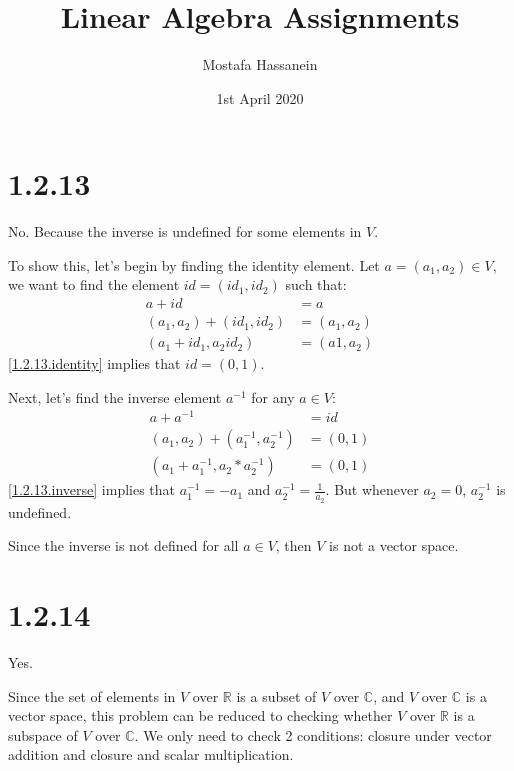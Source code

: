 \documentclass{article}
\author{Mostafa Hassanein}
\title{Linear Algebra Assignments}
\date{1st April 2020}
\begin{document}
\maketitle

\newpage

\section*{1.2.13}

No. Because the inverse is undefined for some elements in $V$.
\newline

\noindent 
To show this, let's begin by finding the identity element. Let $a=(a_1,a_2) \in V$, we want to find the element $id=(id_1, id_2)$ such that:
\begin{align}
  a+id&=a \nonumber \\
  (a_1, a_2) + (id_1, id_2) &= (a_1, a_2) \nonumber \\
  (a_1 + id_1, a_2id_2) &= (a1, a_2) \label{1.2.13.identity}
\end{align}
\eqref{1.2.13.identity} implies that $id=(0,1)$.
\newline

\noindent
Next, let's find the inverse element $a^{-1}$ for any $a \in V$:
\begin{align}
  a + a^{-1} &= id \nonumber \\
  (a_1, a_2) + (a^{-1}_1, a^{-1}_2) &= (0, 1) \nonumber \\
  (a_1 + a^{-1}_1, a_2*a^{-1}_2) &= (0, 1) \label{1.2.13.inverse}
\end{align}
\eqref{1.2.13.inverse} implies that $a^{-1}_1 = -a_1$ and $a^{-1}_2=\frac{1}{a_2}$. But whenever $a_2=0$, $a^{-1}_2$ is undefined.
\newline

\noindent
Since the inverse is not defined for all $a \in V$, then $V$ is not a vector space.

\section*{1.2.14}
Yes.
\newline

\noindent
Since the set of elements in $V$ over $\mathbb{R}$ is a subset of $V$ over $\mathbb{C}$, and $V$ over $\mathbb{C}$ is a vector space, this problem can be reduced to checking whether $V$ over $\mathbb{R}$ is a subspace of $V$ over $\mathbb{C}$. We only need to check 2 conditions: closure under vector addition and closure and scalar multiplication.
\newline
\end{document}
